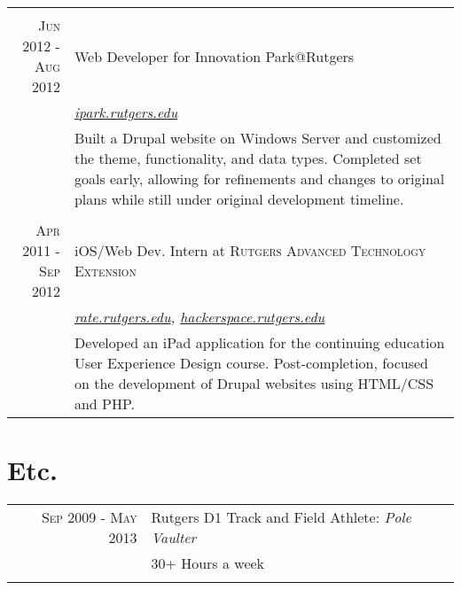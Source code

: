 \documentclass[a4paper, 10pt, onepage]{article} %
\begin{document}
\begin{tabular}{r|p{10cm}}
\multicolumn{2}{c}{}\\
\textsc{Jun 2012 - Aug 2012} & Web Developer for Innovation Park@Rutgers\\
& \small\emph{\href{http://ipark.rutgers.edu}{ipark.rutgers.edu}}\\
& \footnotesize{Built a Drupal website on Windows Server and customized the theme, functionality, and data types. Completed set goals early, allowing for refinements and changes to original plans while still under original development timeline.}\\

\multicolumn{2}{c}{}\\
\textsc{Apr 2011 - Sep 2012} & iOS/Web Dev. Intern at \textsc{Rutgers Advanced Technology Extension}\\
& \small\emph{\href{http://rate.rutgers.edu}{rate.rutgers.edu}, \href{http://hackerspace.rutgers.edu}{hackerspace.rutgers.edu}}\\
& \footnotesize{Developed an iPad application for the continuing education User Experience Design course. Post-completion, focused on the development of Drupal websites using HTML/CSS and PHP.}
\end{tabular}

\section{Etc.}
\begin{tabular}{rp{10cm}}
\textsc{Sep 2009 - May 2013} & Rutgers D1 Track and Field Athlete: \emph{Pole Vaulter}\\
& \small{30+ Hours a week}\\
\multicolumn{2}{c}{}\\
\end{tabular}
\end{document}
